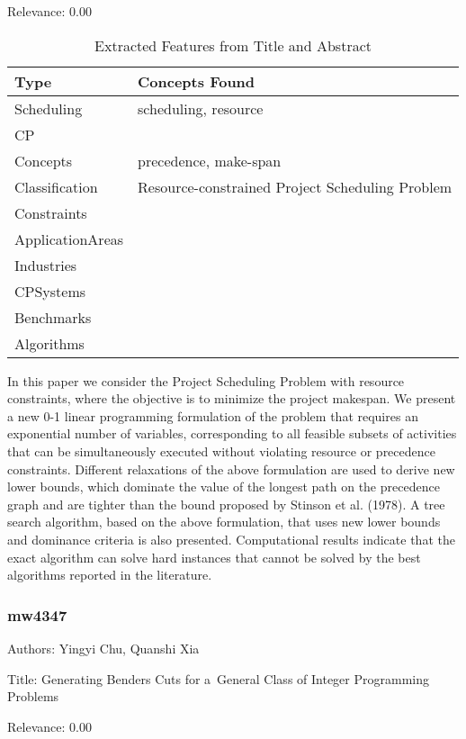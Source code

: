 Relevance:  0.00

{\scriptsize
\begin{longtable}{p{2cm}p{20cm}}
\caption{Extracted Features from Title and Abstract}\\ \toprule
Type & Concepts Found\\ \midrule
\endhead
\bottomrule
\endfoot
Scheduling & scheduling, resource\\ 
CP & \\ 
Concepts & precedence, make-span\\ 
Classification & Resource-constrained Project Scheduling Problem\\ 
Constraints & \\ 
ApplicationAreas & \\ 
Industries & \\ 
CPSystems & \\ 
Benchmarks & \\ 
Algorithms & \\ 
\end{longtable}
}

  In this paper we consider the Project Scheduling Problem with resource constraints, where the objective is to minimize the project makespan. We present a new 0-1 linear programming formulation of the problem that requires an exponential number of variables, corresponding to all feasible subsets of activities that can be simultaneously executed without violating resource or precedence constraints. Different relaxations of the above formulation are used to derive new lower bounds, which dominate the value of the longest path on the precedence graph and are tighter than the bound proposed by Stinson et al. (1978).    A tree search algorithm, based on the above formulation, that uses new lower bounds and dominance criteria is also presented. Computational results indicate that the exact algorithm can solve hard instances that cannot be solved by the best algorithms reported in the literature.  

\subsubsection{mw4347}
\label{mw:mw4347}

Authors: Yingyi Chu, Quanshi Xia

Title: Generating Benders Cuts for a General Class of Integer Programming Problems

Relevance:  0.00

